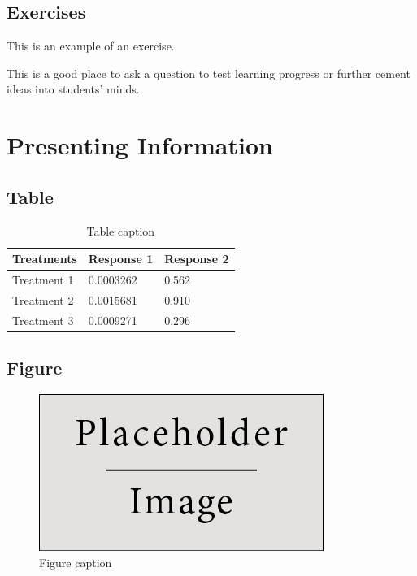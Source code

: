 \documentclass{udc-book}
\begin{document}

\section{Exercises}

This is an example of an exercise.

\begin{exercise}
This is a good place to ask a question to test learning progress or further cement ideas into students' minds.
\end{exercise}




\chapter{Presenting Information}

\section{Table}

\begin{table}[h]
\centering
\begin{tabular}{l l l}
\toprule
\textbf{Treatments} & \textbf{Response 1} & \textbf{Response 2}\\
\midrule
Treatment 1 & 0.0003262 & 0.562 \\
Treatment 2 & 0.0015681 & 0.910 \\
Treatment 3 & 0.0009271 & 0.296 \\
\bottomrule
\end{tabular}
\caption{Table caption}
\end{table}


\section{Figure}

\begin{figure}[h]
\centering\includegraphics[scale=0.5]{placeholder}
\caption{Figure caption}
\end{figure}
\end{document}
